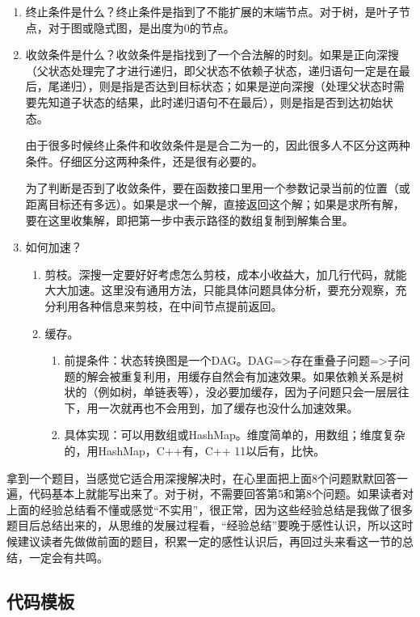 \begin{enumerate}
\item 终止条件是什么？终止条件是指到了不能扩展的末端节点。对于树，是叶子节点，对于图或隐式图，是出度为0的节点。

\item {收敛条件是什么？收敛条件是指找到了一个合法解的时刻。如果是正向深搜（父状态处理完了才进行递归，即父状态不依赖子状态，递归语句一定是在最后，尾递归），则是指是否达到目标状态；如果是逆向深搜（处理父状态时需要先知道子状态的结果，此时递归语句不在最后），则是指是否到达初始状态。

由于很多时候终止条件和收敛条件是是合二为一的，因此很多人不区分这两种条件。仔细区分这两种条件，还是很有必要的。

为了判断是否到了收敛条件，要在函数接口里用一个参数记录当前的位置（或距离目标还有多远）。如果是求一个解，直接返回这个解；如果是求所有解，要在这里收集解，即把第一步中表示路径的数组复制到解集合里。}

\item 如何加速？
    \begin{enumerate}
    \item 剪枝。深搜一定要好好考虑怎么剪枝，成本小收益大，加几行代码，就能大大加速。这里没有通用方法，只能具体问题具体分析，要充分观察，充分利用各种信息来剪枝，在中间节点提前返回。
    \item 缓存。
        \begin{enumerate}
            \item 前提条件：状态转换图是一个DAG。DAG=>存在重叠子问题=>子问题的解会被重复利用，用缓存自然会有加速效果。如果依赖关系是树状的（例如树，单链表等），没必要加缓存，因为子问题只会一层层往下，用一次就再也不会用到，加了缓存也没什么加速效果。
            \item 具体实现：可以用数组或HashMap。维度简单的，用数组；维度复杂的，用HashMap，C++有，C++ 11以后有，比快。
        \end{enumerate}
    
    \end{enumerate}
\end{enumerate}

拿到一个题目，当感觉它适合用深搜解决时，在心里面把上面8个问题默默回答一遍，代码基本上就能写出来了。对于树，不需要回答第5和第8个问题。如果读者对上面的经验总结看不懂或感觉“不实用”，很正常，因为这些经验总结是我做了很多题目后总结出来的，从思维的发展过程看，“经验总结”要晚于感性认识，所以这时候建议读者先做做前面的题目，积累一定的感性认识后，再回过头来看这一节的总结，一定会有共鸣。


\subsection{代码模板}

